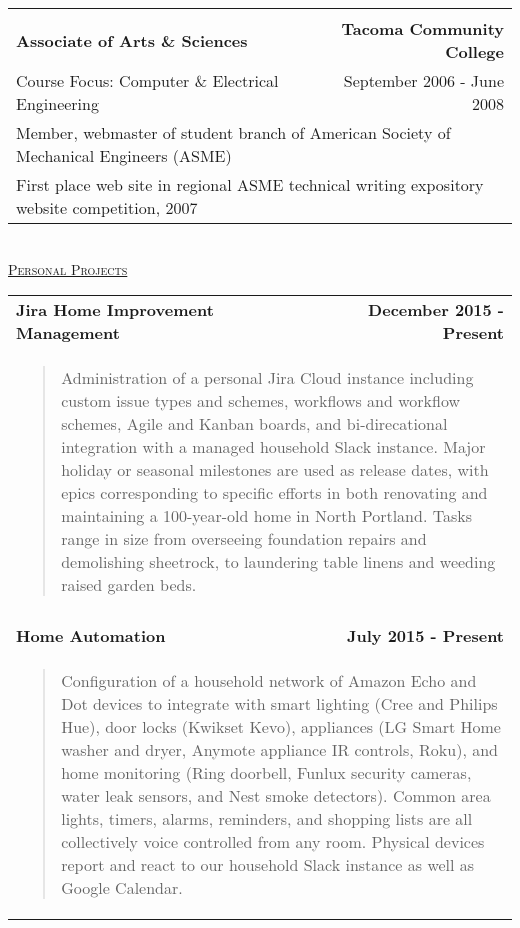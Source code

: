 \documentclass[letterpaper]{article}
\begin{document}
\begin{center}
\begin{tabular}{p{}r}
			\\
			\\
				\textbf{Associate of Arts \& Sciences}		    	&
				\textbf{Tacoma Community College \quad}
			\\
				{\quad Course Focus: Computer \& Electrical Engineering}	&
				{September 2006 - June 2008 \quad\quad}
			\\
				\multicolumn{2}{p{\textwidth}}{\quad Member, webmaster of student branch of American Society of Mechanical Engineers (ASME)}	
			\\
				\multicolumn{2}{p{\textwidth}}{\quad First place web site in regional ASME technical writing expository website competition, 2007}
		\end{tabular}
		\vspace{0.5in} \\ %
		\underline{\large \scshape Personal Projects} \\
		\begin{tabular}{p{}r}
				\textbf{Jira Home Improvement Management}							&
				\textbf{December 2015 - Present \quad}
			\\
				\multicolumn{2}{p{\textwidth}}{\vspace{-0.2in}\begin{quote} Administration of a personal Jira Cloud instance including custom issue types and schemes, workflows and workflow schemes, Agile and Kanban boards, and bi-direcational integration with a managed household Slack instance. Major holiday or seasonal milestones are used as release dates, with epics corresponding to specific efforts in both renovating and maintaining a 100-year-old home in North Portland. Tasks range in size from overseeing foundation repairs and demolishing sheetrock, to laundering table linens and weeding raised garden beds.\end{quote}}
			
			\\
			\\
				\textbf{Home Automation}			&
				\textbf{July 2015 - Present \quad}
			\\
				\multicolumn{2}{p{\textwidth}}{\vspace{-0.2in}\begin{quote} Configuration of a household network of Amazon Echo and Dot devices to integrate with smart lighting (Cree and Philips Hue), door locks (Kwikset Kevo), appliances (LG Smart Home washer and dryer, Anymote appliance IR controls, Roku), and home monitoring (Ring doorbell, Funlux security cameras, water leak sensors, and Nest smoke detectors). Common area lights, timers, alarms, reminders, and shopping lists are all collectively voice controlled from any room. Physical devices report and react to our household Slack instance as well as Google Calendar.\end{quote}}
		\end{tabular}
	\end{center} 
\end{document}
